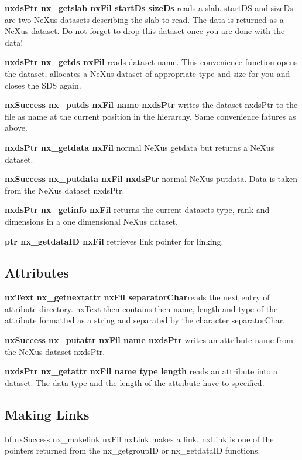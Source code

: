 \documentclass[12pt,a4paper]{article}
\begin{document}
{\bf nxdsPtr nx\_getslab nxFil startDs sizeDs} reads a slab. startDS
and sizeDs are two NeXus datasets describing the slab to read. The
data is returned as a NeXus dataset. Do not forget to drop this
dataset once you are done with the data! 

{\bf nxdsPtr nx\_getds nxFil} reads dataset name. This convenience
function opens the dataset, allocates a NeXus dataset of appropriate
type and size for you and closes the SDS again.

{\bf nxSuccess nx\_putds nxFil  name nxdsPtr} writes the dataset
nxdsPtr to the file as name at the current position in the
hierarchy. Same convenience fatures as above.

{\bf nxdsPtr nx\_getdata nxFil} normal NeXus getdata but returns a
NeXus dataset.

{\bf nxSuccess nx\_putdata nxFil nxdsPtr} normal NeXus putdata. Data is
taken from the NeXus dataset nxdsPtr.

{\bf nxdsPtr nx\_getinfo nxFil} returns the current datasets type, rank
and dimensions in a one dimensional NeXus dataset.

{\bf ptr nx\_getdataID nxFil} retrieves link pointer for linking.

\subsection{Attributes}
{\bf nxText nx\_getnextattr nxFil  separatorChar}reads the next entry
of attribute directory. nxText then contains then name, length and
type of the attribute formatted as a string and separated by the
character separatorChar.

{\bf nxSuccess nx\_putattr nxFil name nxdsPtr} writes an attribute name
from the NeXus dataset nxdsPtr.

{\bf nxdsPtr nx\_getattr nxFil name type length} reads an attribute
into a dataset. The data type and the length of the attribute have to
specified. 

\subsection{Making Links}
{bf nxSuccess nx\_makelink nxFil nxLink}  makes a link. nxLink is one
of the pointers returned from the nx\_getgroupID or nx\_getdataID
functions. 
\end{document}

